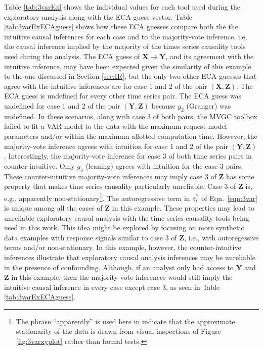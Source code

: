 \documentclass{article}[10pt]
\begin{document}
Table \ref{tab:3varEx} shows the individual values for each tool used during the exploratory analysis along with the ECA guess vector.  Table \ref{tab:3varExECAguess} shows how these ECA guesses compare both the the intuitive causal inferences for each case and to the majority-vote inference, i.e, the causal inference implied by the majority of the times series causality tools used during the analysis.  The ECA guess of $\mathbf{X}\rightarrow\mathbf{Y}$, and its agreement with the intuitive inference, may have been expected given the similarity of this example to the one discussed in Section \ref{sec:IR}, but the only two other ECA guesses that agree with the intuitive inferences are for case 1 and 2 of the pair $(\mathbf{X},\mathbf{Z})$.  The ECA guess is undefined for every other time series pair.  The ECA guess was undefined for case 1 and 2 of the pair $(\mathbf{Y},\mathbf{Z})$ because $g_2$ (Granger) was undefined.  In these scenarios, along with case 3 of both pairs, the MVGC toolbox failed to fit a VAR model to the data with the maximum request model parameters and/or within the maximum allotted computation time.  However, the majority-vote inference agrees with intuition for case 1 and 2 of the pair $(\mathbf{Y},\mathbf{Z})$.  Interestingly, the majority-vote inference for case 3 of both time series pairs in counter-intuitive.  Only $g_4$ (leaning) agrees with intuition for the case 3 pairs.  These counter-intuitive majority-vote inferences may imply case 3 of $\mathbf{Z}$ has some property that makes time series causality particularly unreliable.  Case 3 of $\mathbf{Z}$ is, e.g., apparently non-stationary\footnote{The phrase ``apparently'' is used here in indicate that the approximate stationarity of the data is drawn from visual inspections of Figure \ref{fig:3varxyplot} rather than formal tests.}.  The autoregressive term in $z_t^{\prime\prime}$ of Eqn.\ \ref{eqn:3var} is unique among all the cases of $\mathbf{Z}$ in this example.  These properties may lead to unreliable exploratory causal analysis with the time series causality tools being used in this work.  This idea might be explored by focusing on more synthetic data examples with response signals similar to case 3 of $\mathbf{Z}$, i.e., with autoregessive terms and/or non-stationary.  In this example, however, the counter-intuitive inferences illustrate that exploratory causal analysis inferences may be unreliable in the presence of confounding.  Although, if an analyst only had access to $\mathbf{Y}$ and $\mathbf{Z}$ in this example, then the majority-vote inferences would still imply the intuitive causal inference in every case except case 3, as seen in Table \ref{tab:3varExECAguess}.
\end{document}
